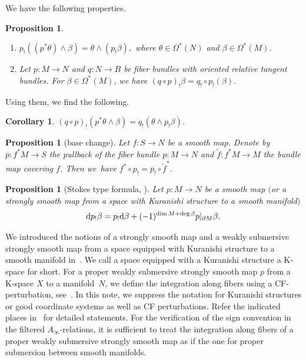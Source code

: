 \documentclass[pdftex]{sigma}
\numberwithin{equation}{section}
\newtheorem{cor}[thm]{Corollary}
\newtheorem{prop}[thm]{Proposition}
\theoremstyle{definition}
\begin{document}
We have the following properties.

\begin{prop}\quad%
\begin{enumerate}\itemsep=0pt
\item[$(1)$] $p_! ( ( p^* \theta ) \wedge \beta ) = \theta \wedge (p_! \beta),$ where $\theta \in \Omega^*(N)$ and
$\beta \in \Omega^*(M)$.

\item[$(2)$]
Let $p\colon M \to N$ and $q\colon N \to B$ be fiber bundles with oriented relative tangent bundles. For $\beta \in \Omega^*(M)$, we have
$(q \circ p)_! \beta = q_! \circ p_! (\beta)$.
\end{enumerate}
\end{prop}

Using them, we find the following.

\begin{cor}\label{iteratefib}
$(q \circ p)_! (p^* \theta \wedge \beta) = q_! (\theta \wedge p_! \beta)$.
\end{cor}


\begin{prop}[base change]\label{base change}
Let $f\colon S \to N$ be a smooth map.
Denote by $\overline{p}\colon f^*M \to S$ the pullback of the fiber bundle $p\colon M \to N$ and $\widetilde{f}\colon f^*M \to M$ the bundle map
covering $f$. Then we~have
$f^* \circ p_! = \overline{p}_! \circ \widetilde{f}^*$.
\end{prop}


\begin{prop}[Stokes type formula, {\cite[Theorem 9.28]{FOOO20}}]\label{Stokes-Pr}
Let $p\colon M \to N$ be a smooth map $($or a strongly smooth map from a space with Kuranishi structure to a smooth manifold$)$
\[{\rm d} p_! \beta = p_!  {\rm d}\beta +(-1)^{\dim M + \deg \beta} p\vert_{\partial M} \beta.\]
\end{prop}

We introduced the notions of a strongly smooth map and a weakly submersive strongly smooth map from a space
equipped with Kuranishi structure to a smooth manifold
in~\cite[Definition~3.40\,(4),~(5)]{FOOO20}. We call a space equipped with a Kuranishi structure a K-space for short.
For a proper weakly submersive strongly smooth map $p$ from a K-space $X$ to a manifold~$N$, we define the integration along fibers
using a CF-perturbation, see~\cite[Section~9.2]{FOOO20}.
In this note, we suppress the notation for Kuranishi structures or good coordinate systems as well as
CF perturbations. Refer the indicated places in~\cite{FOOO20} for detailed statements.
For the verification of the sign convention in the filtered $A_{\infty}$-relations, it is sufficient to treat the integration along fibers of
a proper weakly submersive strongly smooth map as if the one for proper submersion between smooth manifolds.
\end{document}
